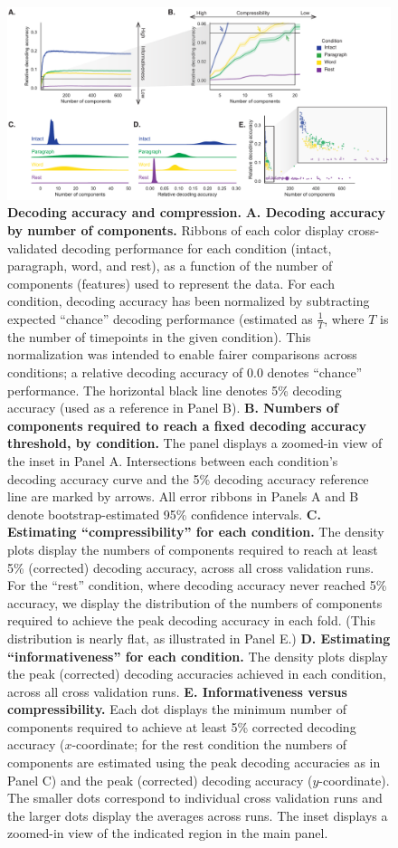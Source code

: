 \documentclass[english, 11pt]{article}
\begin{document}
\begin{figure}[tp]
  \centering
  
  \includegraphics[width=\textwidth]{figs/decoding_and_inflection}

\caption{\textbf{Decoding accuracy and compression.} \textbf{A. Decoding
accuracy by number of components.} Ribbons of each color display
cross-validated decoding performance for each condition (intact, paragraph,
word, and rest), as a function of the number of components (features) used to
represent the data. For each condition, decoding accuracy has been normalized
by subtracting expected ``chance'' decoding performance (estimated as
$\frac{1}{T}$, where $T$ is the number of timepoints in the given condition).
This normalization was intended to enable fairer comparisons across conditions;
a relative decoding accuracy of 0.0 denotes ``chance'' performance. The
horizontal black line denotes 5\% decoding accuracy (used as a reference in
Panel B). \textbf{B. Numbers of components required to reach a fixed decoding
accuracy threshold, by condition.} The panel displays a zoomed-in view of the
inset in Panel A. Intersections between each condition's decoding accuracy
curve and the 5\% decoding accuracy reference line are marked by arrows. All
error ribbons in Panels A and B denote bootstrap-estimated 95\% confidence
intervals. \textbf{C. Estimating ``compressibility'' for each condition.} The
density plots display the numbers of components required to reach at least 5\%
(corrected) decoding accuracy, across all cross validation runs. For the
``rest'' condition, where decoding accuracy never reached 5\% accuracy, we
display the distribution of the numbers of components required to achieve the
peak decoding accuracy in each fold. (This distribution is nearly flat, as
illustrated in Panel E.) \textbf{D. Estimating ``informativeness'' for each
condition.} The density plots display the peak (corrected) decoding accuracies
achieved in each condition, across all cross validation runs. \textbf{E.
Informativeness versus compressibility.} Each dot displays the minimum number
of components required to achieve at least 5\% corrected decoding accuracy
($x$-coordinate; for the rest condition the numbers of components are estimated
using the peak decoding accuracies as in Panel C) and the peak (corrected)
decoding accuracy ($y$-coordinate). The smaller dots correspond to individual
cross validation runs and the larger dots display the averages across runs. The
inset displays a zoomed-in view of the indicated region in the main panel.}

\label{fig:inflection}
\end{figure}
\end{document}
